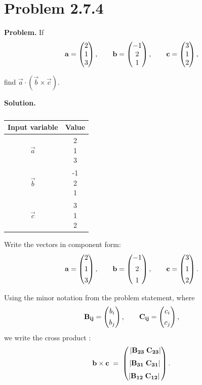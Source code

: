 \documentclass[12pt]{article}
\begin{document}
\section*{Problem 2.7.4}

\textbf{Problem.}
If
\begin{align}
\mathbf a = \begin{pmatrix}2 \\1 \\3\end{pmatrix},\qquad
\mathbf b = \begin{pmatrix}-1 \\2 \\1\end{pmatrix},\qquad
\mathbf c = \begin{pmatrix}3 \\1 \\2\end{pmatrix},
\end{align}

find $\vec a\cdot(\vec b\times\vec c)$.


\textbf{Solution.}

\begin{table}[H]
\centering
\begin{tabular}[12pt]{ |c| c|}
    \hline
    \textbf{Input variable} & \textbf{Value}\\ 
    \hline
    $\vec{a}$ & \myvec{2 \\1 \\3} \\
    \hline 
    $\vec{b}$ & \myvec{-1 \\2 \\1}\\
    \hline
    $\vec{c}$ & \myvec{3 \\1 \\2}\\
    \hline
    \end{tabular}
    \caption{}
    \label{}
 \end{table}
Write the vectors in component form:
\begin{align}
\mathbf a=\begin{pmatrix}2\\[4pt]1\\[4pt]3\end{pmatrix},\qquad
\mathbf b=\begin{pmatrix}-1\\[4pt]2\\[4pt]1\end{pmatrix},\qquad
\mathbf c=\begin{pmatrix}3\\[4pt]1\\[4pt]2\end{pmatrix}.
\end{align}

Using the minor notation from the problem statement, where
\begin{align}
\mathbf{B_{ij}}=\begin{pmatrix}b_i\\[4pt]b_j\end{pmatrix},\qquad \mathbf{C_{ij}}=\begin{pmatrix}c_i\\[4pt]c_j\end{pmatrix},
\end{align}
we write the cross product :
\begin{align}
\mathbf b\times\mathbf c \;=\;
\begin{pmatrix}\,\lvert \mathbf{B_{23}}\;\mathbf{C_{23}}\rvert \\[6pt] \lvert \mathbf{B_{31}}\;\mathbf{C_{31}}\rvert \\[6pt] \lvert \mathbf{B_{12}}\;\mathbf{C_{12}}\rvert\, \end{pmatrix}.
\end{align}
\end{document}
